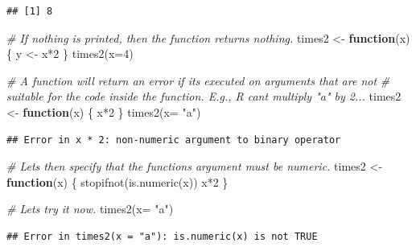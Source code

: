 \documentclass[
]{book}
\newenvironment{Shaded}{\begin{snugshade}}{\end{snugshade}}
\newcommand{\AttributeTok}[1]{\textcolor[rgb]{0.77,0.63,0.00}{#1}}
\newcommand{\CommentTok}[1]{\textcolor[rgb]{0.56,0.35,0.01}{\textit{#1}}}
\newcommand{\ControlFlowTok}[1]{\textcolor[rgb]{0.13,0.29,0.53}{\textbf{#1}}}
\newcommand{\DecValTok}[1]{\textcolor[rgb]{0.00,0.00,0.81}{#1}}
\newcommand{\FunctionTok}[1]{\textcolor[rgb]{0.00,0.00,0.00}{#1}}
\newcommand{\NormalTok}[1]{#1}
\newcommand{\OtherTok}[1]{\textcolor[rgb]{0.56,0.35,0.01}{#1}}
\newcommand{\SpecialCharTok}[1]{\textcolor[rgb]{0.00,0.00,0.00}{#1}}
\newcommand{\StringTok}[1]{\textcolor[rgb]{0.31,0.60,0.02}{#1}}
\begin{document}
\begin{verbatim}
## [1] 8
\end{verbatim}

\begin{Shaded}
\begin{Highlighting}[]
\CommentTok{\# If nothing is printed, then the function returns nothing.}
\NormalTok{times2 }\OtherTok{\textless{}{-}} \ControlFlowTok{function}\NormalTok{(x) \{}
\NormalTok{  y }\OtherTok{\textless{}{-}}\NormalTok{ x}\SpecialCharTok{*}\DecValTok{2}
\NormalTok{\}}
\FunctionTok{times2}\NormalTok{(}\AttributeTok{x=}\DecValTok{4}\NormalTok{)}

\CommentTok{\# A function will return an error if it\textquotesingle{}s executed on arguments that are not}
\CommentTok{\# suitable for the code inside the function. E.g., R can\textquotesingle{}t multiply "a" by 2...}
\NormalTok{times2 }\OtherTok{\textless{}{-}} \ControlFlowTok{function}\NormalTok{(x) \{}
\NormalTok{  x}\SpecialCharTok{*}\DecValTok{2}
\NormalTok{\}}
\FunctionTok{times2}\NormalTok{(}\AttributeTok{x=} \StringTok{"a"}\NormalTok{)}
\end{Highlighting}
\end{Shaded}

\begin{verbatim}
## Error in x * 2: non-numeric argument to binary operator
\end{verbatim}

\begin{Shaded}
\begin{Highlighting}[]
\CommentTok{\# Let\textquotesingle{}s then specify that the function\textquotesingle{}s argument must be numeric.}
\NormalTok{times2 }\OtherTok{\textless{}{-}} \ControlFlowTok{function}\NormalTok{(x) \{}
  \FunctionTok{stopifnot}\NormalTok{(}\FunctionTok{is.numeric}\NormalTok{(x))  }
\NormalTok{  x}\SpecialCharTok{*}\DecValTok{2}
\NormalTok{\}}

\CommentTok{\# Let\textquotesingle{}s try it now.}
\FunctionTok{times2}\NormalTok{(}\AttributeTok{x=} \StringTok{"a"}\NormalTok{)}
\end{Highlighting}
\end{Shaded}

\begin{verbatim}
## Error in times2(x = "a"): is.numeric(x) is not TRUE
\end{verbatim}
\end{document}

